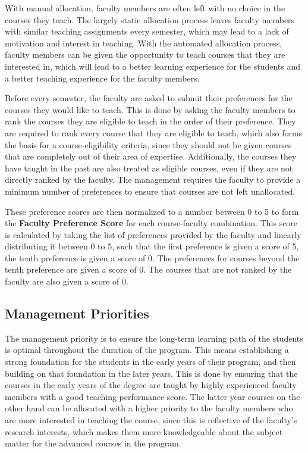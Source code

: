 With manual allocation, faculty members are often left with no choice in the courses they teach. The largely static allocation process leaves faculty members with similar teaching assignments every semester, which may lead to a lack of motivation and interest in teaching. With the automated allocation process, faculty members can be given the opportunity to teach courses that they are interested in, which will lead to a better learning experience for the students and a better teaching experience for the faculty members.

Before every semester, the faculty are asked to submit their preferences for the courses they would like to teach. This is done by asking the faculty members to rank the courses they are eligible to teach in the order of their preference. They are required to rank every course that they are eligible to teach, which also forms the basis for a course-eligibility criteria, since they should not be given courses that are completely out of their area of expertise. Additionally, the courses they have taught in the past are also treated as eligible courses, even if they are not directly ranked by the faculty. The management requires the faculty to provide a minimum number of preferences to ensure that courses are not left unallocated.

These preference scores are then normalized to a number between 0 to 5 to form the \textbf{Faculty Preference Score} for each course-faculty combination. This score is calculated by taking the list of preferences provided by the faculty and linearly distributing it between 0 to 5, such that the first preference is given a score of 5, the tenth preference is given a score of 0. The preferences for courses beyond the tenth preference are given a score of 0. The courses that are not ranked by the faculty are also given a score of 0.

\subsection{Management Priorities}

The management priority is to ensure the long-term learning path of the students is optimal throughout the duration of the program. This means establishing a strong foundation for the students in the early years of their program, and then building on that foundation in the later years. This is done by ensuring that the courses in the early years of the degree are taught by highly experienced faculty members with a good teaching performance score. The latter year courses on the other hand can be allocated with a higher priority to the faculty members who are more interested in teaching the course, since this is reflective of the faculty's research interests, which makes them more knowledgeable about the subject matter for the advanced courses in the program.

